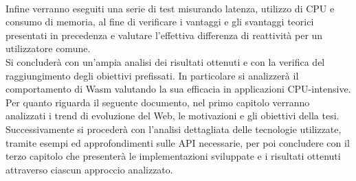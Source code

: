\\Infine verranno eseguiti una serie di test misurando latenza, utilizzo di CPU e consumo di memoria, al fine di verificare i vantaggi e gli svantaggi teorici presentati in precedenza e valutare l'effettiva differenza di reattività per un utilizzatore comune.
\\Si concluderà con un'ampia analisi dei risultati ottenuti e con la verifica del raggiungimento degli obiettivi prefissati. In particolare si analizzerà il comportamento di Wasm valutando la sua efficacia in applicazioni CPU-intensive.
\\Per quanto riguarda il seguente documento, nel primo capitolo verranno analizzati i trend di evoluzione del Web, le motivazioni e gli obiettivi della tesi.
Successivamente si procederà con l'analisi dettagliata delle tecnologie utilizzate, tramite esempi ed approfondimenti sulle API necessarie, per poi concludere con il terzo capitolo che presenterà le implementazioni sviluppate e i risultati ottenuti attraverso ciascun approccio analizzato.